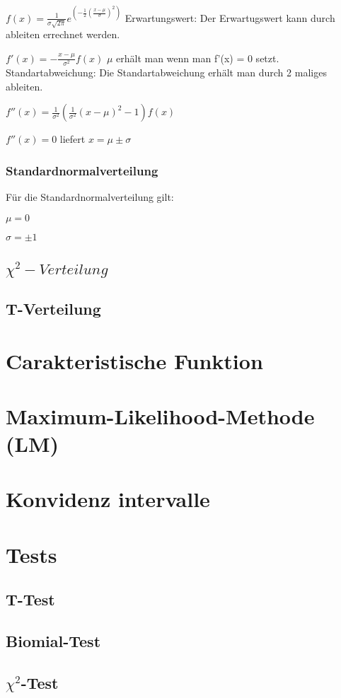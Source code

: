 \documentclass[a4paper, 11pt]{article}
\begin{document}
$f(x) = \frac{1} {\sigma \sqrt{2\pi}} e^{(-\frac{1}{2}(\frac{x-\mu}{\sigma})^2)}$
\newline\newline Erwartungswert:
\newline Der Erwartugswert kann durch ableiten errechnet werden.

$f'(x) = -\frac{x-\mu} {\sigma^2} f(x)$
$\mu$ erhält man wenn man f'(x) = 0 setzt.
\newline\newline Standartabweichung:
\newline Die Standartabweichung erhält man durch 2 maliges ableiten.


$f''(x) = \frac{1}{\sigma^2} (\frac{1}{\sigma^2} (x-\mu)^2 - 1) f(x)$


$f''(x) = 0 $ liefert $ x = \mu \pm \sigma$

\subsubsection{Standardnormalverteilung}
Für die Standardnormalverteilung gilt:


$\mu = 0$


$\sigma = \pm 1$

\subsection{$\chi^2-Verteilung$}
\subsection{T-Verteilung}
\section{Carakteristische Funktion}
\section{Maximum-Likelihood-Methode (LM)}
\section{Konvidenz intervalle}
\section{Tests}
\subsection{T-Test}
\subsection{Biomial-Test}
\subsection{$\chi^2$-Test}
\end{document}
